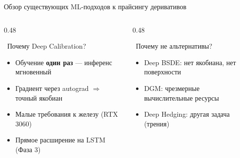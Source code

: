 \documentclass[aspectratio=169, 10pt]{beamer}
\begin{document}
\begin{frame}{Обзор существующих ML-подходов к прайсингу деривативов}
  \vspace{0.3em}
  \begin{columns}[T]
    \begin{column}{0.48\textwidth}
      \begin{exampleblock}{\faCheckCircle\ Почему Deep Calibration?}
        \scriptsize
        \begin{itemize}
          \item Обучение \textbf{один раз} — инференс мгновенный
          \item Градиент через autograd $\Rightarrow$ точный якобиан
          \item Малые требования к железу (RTX 3060)
          \item Прямое расширение на LSTM (Фаза 3)
        \end{itemize}
      \end{exampleblock}
    \end{column}
    \begin{column}{0.48\textwidth}
      \begin{alertblock}{\faTimesCircle\ Почему не альтернативы?}
        \scriptsize
        \begin{itemize}
          \item Deep BSDE: нет якобиана, нет поверхности
          \item DGM: чрезмерные вычислительные ресурсы
          \item Deep Hedging: другая задача (трения)
        \end{itemize}
      \end{alertblock}
    \end{column}
  \end{columns}
\end{frame}
\end{document}

